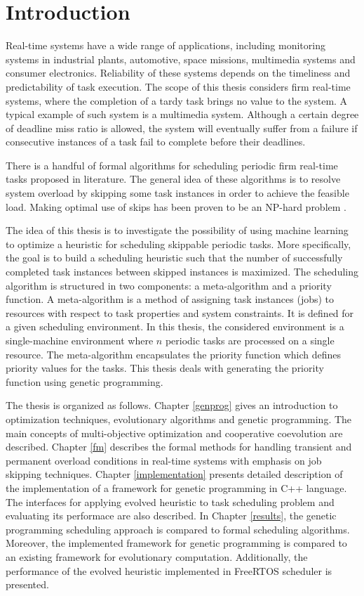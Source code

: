 \chapter*{Introduction}
Real-time systems have a wide range of applications, including monitoring systems in industrial plants, automotive, space missions, multimedia systems and consumer electronics.
Reliability of these systems depends on the timeliness and predictability of task execution.
The scope of this thesis considers firm real-time systems, where the completion of a tardy task brings no value to the system.
A typical example of such system is a multimedia system.
Although a certain degree of deadline miss ratio is allowed, the system will eventually suffer from a failure if consecutive instances of a task fail to complete before their deadlines.

There is a handful of formal algorithms for scheduling periodic firm real-time tasks proposed in literature.
The general idea of these algorithms is to resolve system overload by skipping some task instances in order to achieve the feasible load.
Making optimal use of skips has been proven to be an NP-hard problem \cite{queudet2012quality}.

The idea of this thesis is to investigate the possibility of using machine learning to optimize a heuristic for scheduling skippable periodic tasks.
More specifically, the goal is to build a scheduling heuristic such that the number of successfully completed task instances between skipped instances is maximized.
The scheduling algorithm is structured in two components: a meta-algorithm and a priority function.
A meta-algorithm is a method of assigning task instances (jobs) to resources with respect to task properties and system constraints.
It is defined for a given scheduling environment.
In this thesis, the considered environment is a single-machine environment where $n$ periodic tasks are processed on a single resource. 
The meta-algorithm encapsulates the priority function which defines priority values for the tasks.
This thesis deals with generating the priority function using genetic programming.

The thesis is organized as follows.
Chapter \ref{genprog} gives an introduction to optimization techniques, evolutionary algorithms and genetic programming.
The main concepts of multi-objective optimization and cooperative coevolution are described.
Chapter \ref{fm} describes the formal methods for handling transient and permanent overload conditions in real-time systems with emphasis on job skipping techniques.
Chapter \ref{implementation} presents detailed description of the implementation of a framework for genetic programming in C++ language.
The interfaces for applying evolved heuristic to task scheduling problem and evaluating its performace are also described.
In Chapter \ref{results}, the genetic programming scheduling approach is compared to formal scheduling algorithms. Moreover, the implemented framework for genetic programming is compared to an existing framework for evolutionary computation.
Additionally, the performance of the evolved heuristic implemented in FreeRTOS scheduler is presented. 